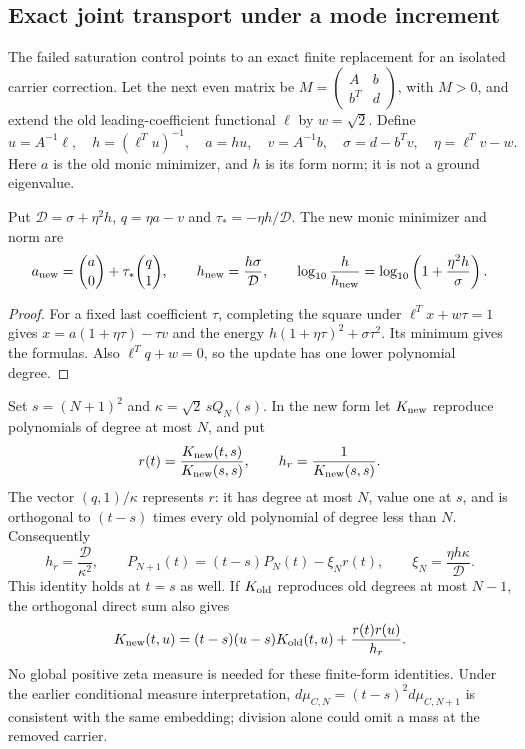 \subsection{Exact joint transport under a mode increment}
\label{ssec:joint-mode-transport}

The failed saturation control points to an exact finite replacement for
an isolated carrier correction. Let the next even matrix be
$M=\left(\begin{smallmatrix}A&b\\b^T&d\end{smallmatrix}\right)$,
with $M>0$, and extend the old leading-coefficient functional $\ell$
by $w=\sqrt2$. Define
\[
 u=A^{-1}\ell,\quad h=(\ell^Tu)^{-1},\quad a=hu,\quad
 v=A^{-1}b,\quad \sigma=d-b^Tv,\quad \eta=\ell^Tv-w.
\]
Here $a$ is the old monic minimizer, and $h$ is its form norm; it is
not a ground eigenvalue.

\begin{proposition}
\label{prop:joint-mode-update}
Put $\mathcal D=\sigma+\eta^2h$, $q=\eta a-v$ and
$\tau_*=-\eta h/\mathcal D$. The new monic minimizer and norm are
\[
 a_{\rm new}=\binom a0+\tau_*\binom q1,
 \qquad h_{\rm new}=\frac{h\sigma}{\mathcal D},
 \qquad \log_{10}\frac h{h_{\rm new}}
       =\log_{10}\left(1+\frac{\eta^2h}{\sigma}\right).
\]
\end{proposition}
\begin{proof}
For a fixed last coefficient $\tau$, completing the square under
$\ell^Tx+w\tau=1$ gives $x=a(1+\eta\tau)-\tau v$ and the energy
$h(1+\eta\tau)^2+\sigma\tau^2$. Its minimum gives the formulas.
Also $\ell^Tq+w=0$, so the update has one lower polynomial degree.
\end{proof}

Set $s=(N+1)^2$ and $\kappa=\sqrt2\,sQ_N(s)$. In the new form let
$K_{\rm new}$ reproduce polynomials of degree at most $N$, and put
\[
 r(t)=\frac{K_{\rm new}(t,s)}{K_{\rm new}(s,s)},
 \qquad h_r=\frac1{K_{\rm new}(s,s)}.
\]
The vector $(q,1)/\kappa$ represents $r$: it has degree at most $N$,
value one at $s$, and is orthogonal to $(t-s)$ times every old
polynomial of degree less than $N$. Consequently
\[
 h_r=\frac{\mathcal D}{\kappa^2},\qquad
 P_{N+1}(t)=(t-s)P_N(t)-\xi_Nr(t),\qquad
 \xi_N=\frac{\eta h\kappa}{\mathcal D}.
\]
This identity holds at $t=s$ as well. If $K_{\rm old}$ reproduces
old degrees at most $N-1$, the orthogonal direct sum also gives
\[
 K_{\rm new}(t,u)=(t-s)(u-s)K_{\rm old}(t,u)
                         +\frac{r(t)r(u)}{h_r}.
\]
No global positive zeta measure is needed for these finite-form
identities. Under the earlier conditional measure interpretation,
$d\mu_{C,N}=(t-s)^2d\mu_{C,N+1}$ is consistent with the same
embedding; division alone could omit a mass at the removed carrier.

